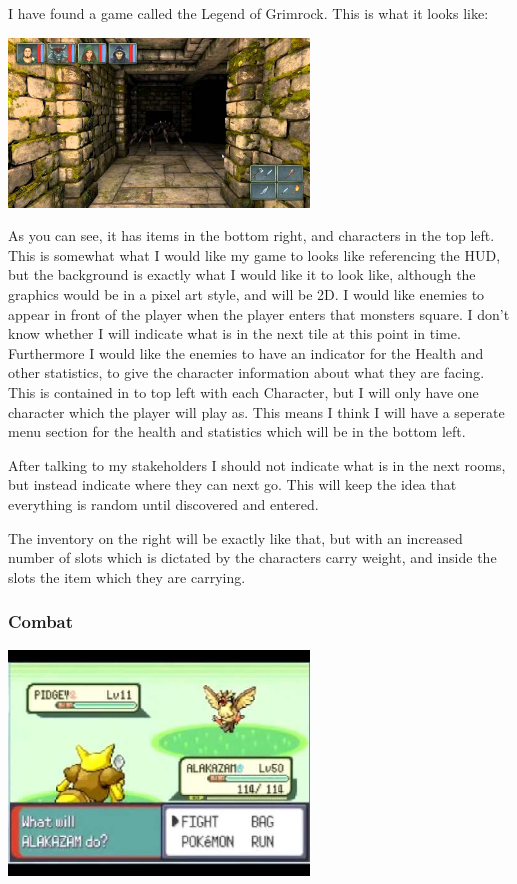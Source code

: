 \documentclass[14pt]{article}
\begin{document}
I have found a game called the Legend of Grimrock. This is what it looks like:

\includegraphics[width = 0.6\textwidth]{Grimlock_Image}

As you can see, it has items in the bottom right, and characters in the top left. This is somewhat what I would like my game to looks like referencing the HUD, but the background is exactly what I would like it to look like, although the graphics would be in a pixel art style, and will be 2D. I would like enemies to appear in front of the player when the player enters that monsters square. I don't know whether I will indicate what is in the next tile at this point in time. Furthermore I would like the enemies to have an indicator for the Health and other statistics, to give the character information about what they are facing. This is contained in to top left with each Character, but I will only have one character which the player will play as. This means I think I will have a seperate menu section for the health and statistics which will be in the bottom left. 

After talking to my stakeholders I should not indicate what is in the next rooms, but instead indicate where they can next go. This will keep the idea that everything is random until discovered and entered.

The inventory on the right will be exactly like that, but with an increased number of slots which is dictated by the characters carry weight, and inside the slots the item which they are carrying.

	
			\subsubsection{Combat}

\includegraphics[width = 0.6\textwidth]{Pokemon_Image}
\end{document}

